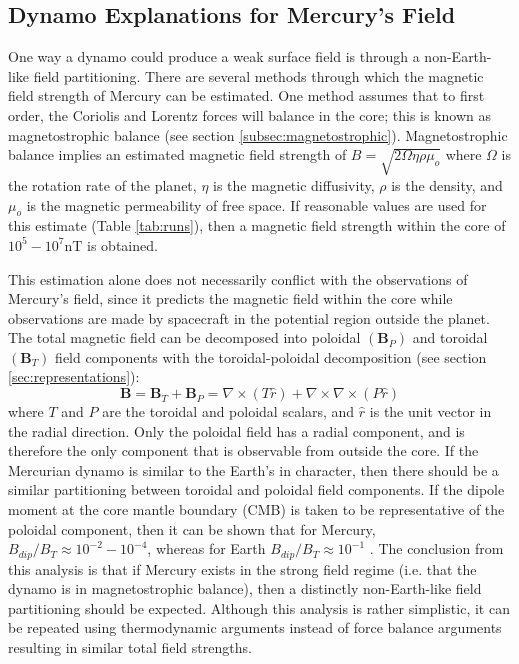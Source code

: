 \subsection{Dynamo Explanations for Mercury's Field}
One way a dynamo could produce a weak surface field is through a non-Earth-like field partitioning. There are several methods through which the magnetic field strength of Mercury can be estimated. One method assumes that to first order, the Coriolis and Lorentz forces will balance in the core; this is known as magnetostrophic balance (see section \ref{subsec:magnetostrophic}). Magnetostrophic balance implies an estimated magnetic field strength of $B=\sqrt{2\Omega\eta\rho\mu_{o}}$ where $\Omega$ is the rotation rate of the planet, $\eta$ is the magnetic diffusivity, $\rho$ is the density, and $\mu_o$ is the magnetic permeability of free space. If reasonable values are used for this estimate (Table \ref{tab:runs}), then a magnetic field strength within the core of $10^{5}-10^{7}$nT is obtained.

This estimation alone does not necessarily conflict with the observations of Mercury's field, since it predicts the magnetic field within the core while observations are made by spacecraft in the potential region outside the planet. The total magnetic field can be decomposed into poloidal $(\mathbf{B}_{P})$ and toroidal $(\mathbf{B}_{T})$ field components with the toroidal-poloidal  decomposition (see section \ref{sec:representations}):
\begin{equation}
\mathbf{B}=\mathbf{B}_{T}+\mathbf{B}_{P}=\nabla\times\left(T\hat{r}\right)+\nabla\times\nabla\times\left(P\hat{r}\right)
\end{equation}
where $T$ and $P$ are the toroidal and poloidal scalars, and $\hat{r}$ is the unit vector in the radial direction. Only the poloidal field has a radial component, and is therefore the only component that is observable from outside the core. If the Mercurian dynamo is similar to the Earth's in character, then there should be a similar partitioning between toroidal and poloidal field components. If the dipole moment at the core mantle boundary (CMB) is taken to be representative of the poloidal component, then it can be shown that for Mercury, $B_{dip}/B_{T}\approx10^{-2}-10^{-4}$, whereas for Earth $B_{dip}/B_{T} \approx 10^{-1}$  \citep{stevenson87}. The conclusion from this analysis is that if Mercury exists in the strong field regime (i.e. that the dynamo is in magnetostrophic balance), then a distinctly non-Earth-like field partitioning should be expected. Although this analysis is rather simplistic, it can be repeated using thermodynamic arguments instead of force balance arguments \citep{schubertandross88,stevenson87} resulting in similar total field strengths.

